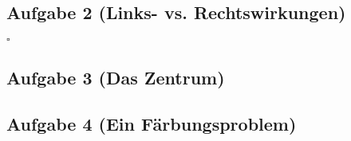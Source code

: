 \documentclass[11pt,a4paper,ngerman]{article}
\begin{document}

\subsection*{Aufgabe 2 \mdseries (Links- vs. Rechtswirkungen)}

\mbox{} \hfill $\square$\\


\subsection*{Aufgabe 3 \mdseries (Das Zentrum)}


\subsection*{Aufgabe 4 \mdseries (Ein Färbungsproblem)}


\label{LastPage}
\end{document}
